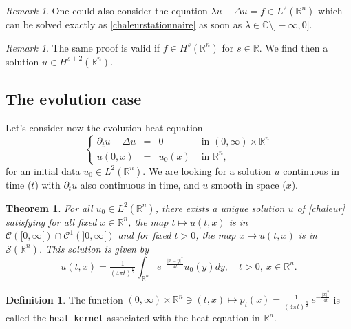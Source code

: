 \documentclass[a4paper, 12pt]{article}
\theoremstyle{plain}
\newtheorem{theorem}[proposition]{Theorem}
\theoremstyle{definition}
\newtheorem{definition}[proposition]{Definition}
\theoremstyle{remark}
\newtheorem{remark}[proposition]{Remark}
\numberwithin{equation}{section}
\begin{document}
\begin{remark}
One could also consider the equation $\lambda u - \Delta u = f \in L^2({\mathds{R}}^n)$ which can be solved exactly as
\eqref{chaleurstationnaire} as soon as $\lambda \in {\mathds{C}} \setminus ]-\infty , 0]$. 
\end{remark}

\begin{remark}
The same proof is valid if $f\in H^s({\mathds{R}}^n)$ for $s\in {\mathds{R}}$. We find then a solution $u \in H^{s+2}({\mathds{R}}^n)$.
\end{remark}

\subsection{The evolution case}

Let's consider now the evolution heat equation
%
\begin{equation}
\label{chaleur}
\left\{
\begin{array}{rcll}
\partial_t u - \Delta u &=& 0 & \mbox{ in } (0,\infty) \times {\mathds{R}}^n\\
u(0,x) & = & u_0(x) &  \mbox{ in } {\mathds{R}}^n,
\end{array}
\right.
\end{equation}
%
for an initial data $u_0 \in L^2({\mathds{R}}^n)$. We are looking for a solution $u$ continuous in time ($t$) with $\partial_tu$ also
continuous in time, and $u$ smooth in space ($x$).

\begin{theorem}
For all $u_0 \in L^2({\mathds{R}}^n)$, there exists a unique solution $u$ of \eqref{chaleur} satisfying for all fixed $x \in {\mathds{R}}^n$,
the map $t \mapsto u(t,x)$ is in ${\mathscr{C}}([0,\infty[ ) \cap {\mathscr{C}}^1(]0,\infty[)$ and for fixed $t > 0$, the map 
$x \mapsto u(t,x)$ is in ${\mathscr{S}}({\mathds{R}}^n)$. This solution is given by
%
\begin{equation} 
\label{noyau}
u(t,x) = \tfrac{1}{(4\pi t)^{\frac n2}} \int_{{\mathds{R}}^n} e^{-\frac{|x-y|^2}{4t}} u_0(y) dy, \quad t>0, \ x \in {\mathds{R}}^n.
\end{equation}
%
\end{theorem}

\begin{definition}
The function $(0,\infty)\times{\mathds{R}}^n\ni (t,x)\mapsto p_t(x)=\frac{1}{(4\pi t)^{\frac n2}}\,e^{-\frac{|x|^2}{4t}}$ is called
the {\tt heat kernel} associated with the heat equation in ${\mathds{R}}^n$.
\end{definition}
\end{document}
